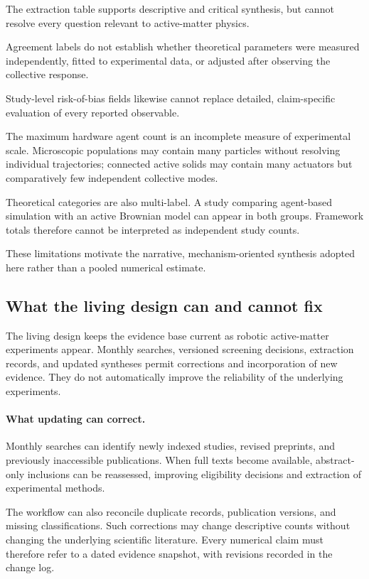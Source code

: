The extraction table supports
descriptive and critical synthesis,
but cannot resolve every question
relevant to active-matter physics.

Agreement labels do not establish
whether theoretical parameters
were measured independently,
fitted to experimental data,
or adjusted after observing
the collective response.

Study-level risk-of-bias fields
likewise cannot replace detailed,
claim-specific evaluation of
every reported observable.

The maximum hardware agent count
is an incomplete measure of
experimental scale. Microscopic
populations may contain many
particles without resolving
individual trajectories; connected
active solids may contain many
actuators but comparatively few
independent collective modes.

Theoretical categories are also
multi-label. A study comparing
agent-based simulation with an
active Brownian model can appear
in both groups. Framework totals
therefore cannot be interpreted
as independent study counts.

These limitations motivate
the narrative, mechanism-oriented
synthesis adopted here rather
than a pooled numerical estimate.

\subsection{What the living design can and cannot fix}
\label{sec:discussion-living}

The living design keeps the evidence base current
as robotic active-matter experiments appear.
Monthly searches, versioned screening decisions,
extraction records, and updated syntheses permit
corrections and incorporation of new evidence.
They do not automatically improve the reliability
of the underlying experiments.

\paragraph*{What updating can correct.}

Monthly searches can identify newly indexed studies,
revised preprints, and previously inaccessible
publications. When full texts become available,
abstract-only inclusions can be reassessed,
improving eligibility decisions and extraction
of experimental methods.

The workflow can also reconcile duplicate records,
publication versions, and missing classifications.
Such corrections may change descriptive counts
without changing the underlying scientific
literature. Every numerical claim must therefore
refer to a dated evidence snapshot, with revisions
recorded in the change log.

